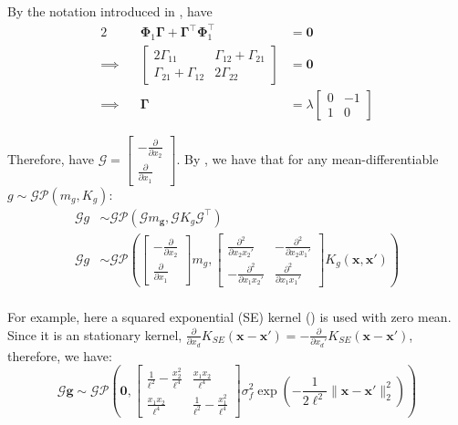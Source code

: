 \documentclass[12pt,a4paper,twoside]{report}
\theoremstyle{definition}
\begin{document}
By the notation introduced in , have 
\begin{alignat*}{2}
	\quad&&\boldsymbol \Phi_1\boldsymbol \Gamma + \boldsymbol \Gamma ^\top \boldsymbol \Phi_1^\top&=\mathbf 0\\
	\implies&&\begin{bmatrix} 2\Gamma_{11}&\Gamma_{12}+\Gamma_{21}\\\Gamma_{21}+\Gamma_{12}&2\Gamma_{22} \end{bmatrix} &=\mathbf 0\\
	\implies&&\boldsymbol \Gamma &= \lambda\begin{bmatrix} 0 & -1\\1&0 \end{bmatrix}
\end{alignat*}

Therefore, have $\mathscr G = \begin{bmatrix} -\frac{\partial}{\partial x_2}\\\frac{\partial}{\partial x_1} \end{bmatrix} $. By , we have that for any mean-differentiable $g\sim \mathcal {GP}(m_ g, K_ g)$:
\begin{align*}
	\mathscr G  g &\sim \mathcal {GP}\left( \mathscr G m_\mathbf g, \mathscr G K_ g \mathscr G^\top \right)\\
	\mathscr G g &\sim \mathcal {GP}\left( 
	\begin{bmatrix} -\frac{\partial}{\partial x_2}\\\frac{\partial}{\partial x_1} \end{bmatrix} m_g, 
		\begin{bmatrix} \frac{\partial^2}{\partial x_2 x_2'} & - \frac{\partial ^2}{\partial x_2x_1'}\\-\frac{\partial^2}{\partial x_1 x_2'} & \frac{\partial ^2}{\partial x_1 x_1'} \end{bmatrix} K_g(\mathbf x,\mathbf x') 
\right)\\
\end{align*}

For example, here a squared exponential (SE) kernel () is used with zero mean. Since it is an stationary kernel, $\frac{\partial}{\partial x_d} K_{SE}(\mathbf x- \mathbf x') = -\frac{\partial}{\partial x_d'}K_{SE}(\mathbf x-\mathbf x')$, therefore, we have:
$$\mathscr G \mathbf g \sim \mathcal {GP}\left( \mathbf 0, \begin{bmatrix} \frac{1}{\ell^2}-\frac{x_2^2}{\ell^4} & \frac{x_1x_2}{\ell^4}\\ \frac{x_1x_2}{\ell^4} & \frac{1}{\ell^2}-\frac{x_1^2}{\ell^4} \end{bmatrix} \sigma_f^2 \exp\left( -\frac{1}{2\ell^2}\|\mathbf x-\mathbf x'\|_2^2 \right)  \right) $$
\end{document}
